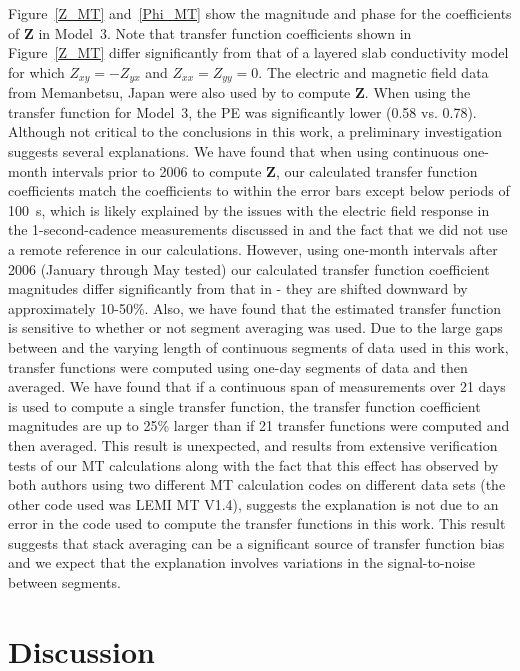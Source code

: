 \documentclass[draft,linenumbers]{agujournal2018}
\begin{document}
Figure~\ref{Z_MT} and~\ref{Phi_MT} show the magnitude and phase for the coefficients of $\mathbf{Z}$ in Model~3. Note that transfer function coefficients shown in Figure~\ref{Z_MT} differ significantly from that of a layered slab conductivity model for which $Z_{xy}=-Z_{yx}$ and $Z_{xx}=Z_{yy}=0$. The electric and magnetic field data from Memanbetsu, Japan were also used by \cite{Fujii2015} to compute $\mathbf{Z}$. When using the \cite{Fujii2015} transfer function for Model~3, the PE was significantly lower (0.58 vs. 0.78). Although not critical to the conclusions in this work, a preliminary investigation suggests several explanations. We have found that when using continuous one-month intervals prior to 2006 to compute $\mathbf{Z}$, our calculated transfer function coefficients match the \cite{Fujii2015} coefficients to within the error bars except below periods of 100~s, which is likely explained by the issues with the electric field response in the 1-second-cadence measurements discussed in \cite{Fujii2015} and the fact that we did not use a remote reference in our calculations. However, using one-month intervals after 2006 (January through May tested) our calculated transfer function coefficient magnitudes differ significantly from that in \cite{Fujii2015} - they are shifted downward by approximately 10-50\%. Also, we have found that the estimated transfer function is sensitive to whether or not segment averaging was used. Due to the large gaps between and the varying length of continuous segments of data used in this work, transfer functions were computed using one-day segments of data and then averaged. We have found that if a continuous span of measurements over 21 days is used to compute a single transfer function, the transfer function coefficient magnitudes are up to 25\% larger than if 21 transfer functions were computed and then averaged. This result is unexpected, and results from extensive verification tests of our MT calculations along with the fact that this effect has observed by both authors using two different MT calculation codes on different data sets (the other code used was LEMI MT V1.4), suggests the explanation is not due to an error in the code used to compute the transfer functions in this work. This result suggests that stack averaging can be a significant source of transfer function bias and we expect that the explanation involves variations in the signal-to-noise between segments.

\section{Discussion}
\label{discussion}
\end{document}
